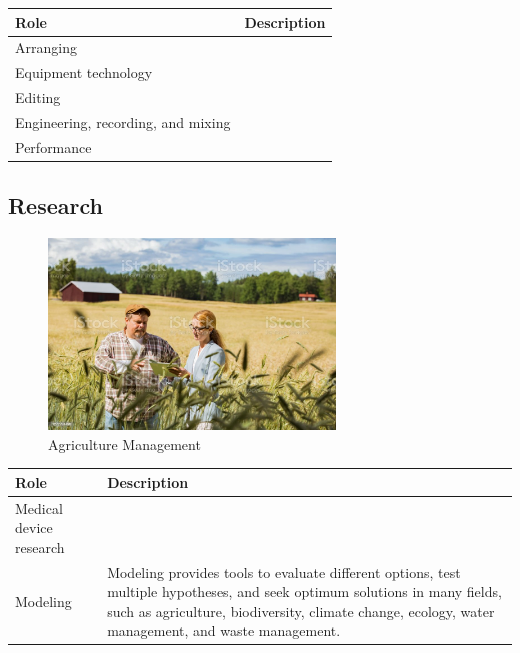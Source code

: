 \begin{table}[H]
	\begin{center}
		\begin{tabular}{p{1in}|p{3.4in}} 
			\textbf{Role} & \textbf{Description}\\
			\hline
			Arranging & \\
			\hline
			Equipment technology & \\
			\hline
			Editing & \\
			\hline
			Engineering, recording, and mixing & \\
			\hline
			Performance & \\
			\hline
		\end{tabular}
	\end{center}
\end{table}

\subsection{Research}

\begin{figure}[H]
	\begin{center}
		\caption{Agriculture Management}
		\vskip 4pt
		\includegraphics[height=2in]{images/careers/istockphoto-1272791496-1024x1024.jpg}
	\end{center}
\end{figure}

\begin{table}[H]
	\begin{center}
		\begin{tabular}{p{1in}|p{3.4in}} 
			\textbf{Role} & \textbf{Description}\\
			\hline
			Medical device research & \\
			\hline
			Modeling & Modeling provides tools to evaluate different options, test multiple hypotheses, and seek optimum solutions in many fields, such as agriculture, biodiversity, climate change, ecology, water management, and waste management.\\
			\hline
		\end{tabular}
	\end{center}
\end{table}

